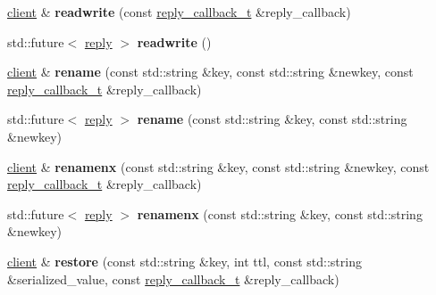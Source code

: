 \begin{DoxyCompactItemize}
\item 
\mbox{\label{classcpp__redis_1_1client_a0a9bfe5e6ec4ccbaf2b633dedc55a581}} 
\mbox{\hyperlink{classcpp__redis_1_1client}{client}} \& {\bfseries readwrite} (const \mbox{\hyperlink{classcpp__redis_1_1client_af7a65eb21aa25230bfbb0b0203c4fc04}{reply\+\_\+callback\+\_\+t}} \&reply\+\_\+callback)
\item 
\mbox{\label{classcpp__redis_1_1client_afc139fc098703cf5ec661fedc0552184}} 
std\+::future$<$ \mbox{\hyperlink{classcpp__redis_1_1reply}{reply}} $>$ {\bfseries readwrite} ()
\item 
\mbox{\label{classcpp__redis_1_1client_abbc2bb4b988d5e3e539d65d3eb9f511f}} 
\mbox{\hyperlink{classcpp__redis_1_1client}{client}} \& {\bfseries rename} (const std\+::string \&key, const std\+::string \&newkey, const \mbox{\hyperlink{classcpp__redis_1_1client_af7a65eb21aa25230bfbb0b0203c4fc04}{reply\+\_\+callback\+\_\+t}} \&reply\+\_\+callback)
\item 
\mbox{\label{classcpp__redis_1_1client_a6a4ab4ac68aa92560569db6683bb591c}} 
std\+::future$<$ \mbox{\hyperlink{classcpp__redis_1_1reply}{reply}} $>$ {\bfseries rename} (const std\+::string \&key, const std\+::string \&newkey)
\item 
\mbox{\label{classcpp__redis_1_1client_a80b0abd5548ae3bfe22ed008767689c0}} 
\mbox{\hyperlink{classcpp__redis_1_1client}{client}} \& {\bfseries renamenx} (const std\+::string \&key, const std\+::string \&newkey, const \mbox{\hyperlink{classcpp__redis_1_1client_af7a65eb21aa25230bfbb0b0203c4fc04}{reply\+\_\+callback\+\_\+t}} \&reply\+\_\+callback)
\item 
\mbox{\label{classcpp__redis_1_1client_a1b5110b73c9561e5b235317fa03ee4bb}} 
std\+::future$<$ \mbox{\hyperlink{classcpp__redis_1_1reply}{reply}} $>$ {\bfseries renamenx} (const std\+::string \&key, const std\+::string \&newkey)
\item 
\mbox{\label{classcpp__redis_1_1client_a3598f781ae048b03edcdb07e8d2c0f41}} 
\mbox{\hyperlink{classcpp__redis_1_1client}{client}} \& {\bfseries restore} (const std\+::string \&key, int ttl, const std\+::string \&serialized\+\_\+value, const \mbox{\hyperlink{classcpp__redis_1_1client_af7a65eb21aa25230bfbb0b0203c4fc04}{reply\+\_\+callback\+\_\+t}} \&reply\+\_\+callback)

\end{DoxyCompactItemize}
